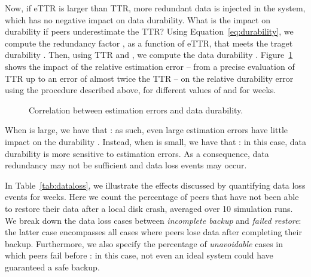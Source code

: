 Now, if eTTR is larger than TTR, more redundant data is injected
in the system, which has no negative impact on data durability. What
is the impact on durability if peers underestimate the TTR?  Using
Equation~\ref{eq:durability}, we compute the redundancy factor , as a
function of eTTR, that meets the traget durability . Then,
using TTR and , we compute the data durability
. Figure~\ref{fig:durability} shows the impact of the relative
estimation error -- from a precise evaluation of TTR up to an error
of almost twice the TTR -- on the relative durability error using
the procedure described above, for different values of  and for
 weeks.
\begin{figure}[ht]
  \centering
 \caption{Correlation between estimation errors and data durability.}
 \label{fig:durability}
\end{figure}
 When  is large, we have that : as such, even
large estimation errors have little impact on the durability
. Instead, when  is small, we have that : in
this case, data durability is more sensitive to estimation errors. As
a consequence, data redundancy may not be sufficient and data loss
events may occur.

In Table~\ref{tab:dataloss}, we illustrate the effects discussed by
quantifying data loss events for  weeks. Here we count the
percentage of peers that have not been able to restore their data
after a local disk crash, averaged over 10 simulation runs. We break
down the data loss cases between \emph{incomplete backup}
and \emph{failed restore}: the latter case encompasses all cases where
peers lose data after completing their backup. Furthermore, we also
specify the percentage of \emph{unavoidable} cases in which peers fail
before : in this case, not even an ideal system could have
guaranteed a safe backup.

